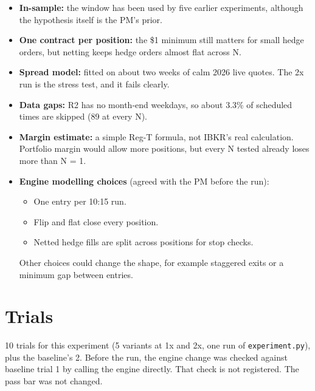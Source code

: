 \documentclass{article}
\begin{document}
\begin{itemize}

\item \textbf{In-sample:} the window has been used by five earlier experiments, although the hypothesis itself is the PM's prior.

\item \textbf{One contract per position:} the \$1 minimum still matters for small hedge orders, but netting keeps hedge orders almost flat across N.

\item \textbf{Spread model:} fitted on about two weeks of calm 2026 live quotes. The 2x run is the stress test, and it fails clearly.

\item \textbf{Data gaps:} R2 has no month-end weekdays, so about 3.3\% of scheduled times are skipped (89 at every N).

\item \textbf{Margin estimate:} a simple Reg-T formula, not IBKR's real calculation. Portfolio margin would allow more positions, but every N tested already loses more than N = 1.

\item \textbf{Engine modelling choices} (agreed with the PM before the run):

\begin{itemize}

\item One entry per 10:15 run.

\item Flip and flat close every position.

\item Netted hedge fills are split across positions for stop checks.

\end{itemize}

Other choices could change the shape, for example staggered exits or a minimum gap between entries.

\end{itemize}

\section{Trials}

10 trials for this experiment (5 variants at 1x and 2x, one run of \texttt{experiment.\allowbreak{}py}), plus the baseline's 2. Before the run, the engine change was checked against baseline trial 1 by calling the engine directly. That check is not registered. The pass bar was not changed.
\end{document}
